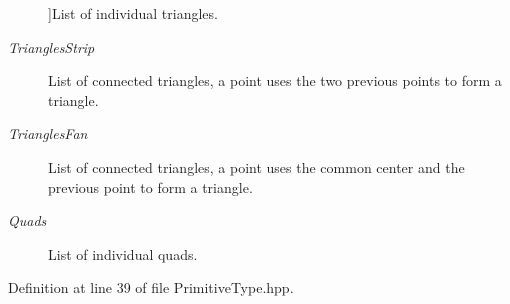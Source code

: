 \begin{Desc}
\begin{description}
{}]List of individual triangles. \item[{\em 
\hypertarget{group__graphics_gga5ee56ac1339984909610713096283b1ba66643dbbb24bbacb405973ed80eebae0}{Triangles\-Strip}\label{group__graphics_gga5ee56ac1339984909610713096283b1ba66643dbbb24bbacb405973ed80eebae0}
}]List of connected triangles, a point uses the two previous points to form a triangle. \item[{\em 
\hypertarget{group__graphics_gga5ee56ac1339984909610713096283b1ba5338a2c6d922151fe50f235036af8a20}{Triangles\-Fan}\label{group__graphics_gga5ee56ac1339984909610713096283b1ba5338a2c6d922151fe50f235036af8a20}
}]List of connected triangles, a point uses the common center and the previous point to form a triangle. \item[{\em 
\hypertarget{group__graphics_gga5ee56ac1339984909610713096283b1ba5041359b76b4bd3d3e6ef738826b8743}{Quads}\label{group__graphics_gga5ee56ac1339984909610713096283b1ba5041359b76b4bd3d3e6ef738826b8743}
}]List of individual quads. \end{description}
\end{Desc}


Definition at line 39 of file Primitive\-Type.\-hpp.

